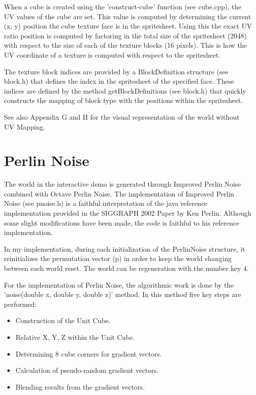 \documentclass{book}
\begin{document}
When a cube is created using the 'construct-cube' function (see cube.cpp), the UV values of the cube are set.  This value is computed by determining the current (x, y) position the cube texture face is in the spritesheet.  Using this the exact UV ratio position is computed by factoring in the total size of the spritesheet (2048) with respect to the size of each of the texture blocks (16 pixels).  This is how the UV coordinate of a texture is computed with respect to the spritesheet.
    
The texture block indices are provided by a BlockDefinition structure (see block.h) that defines the index in the spritesheet of the specified face.  These indices are defined by the method getBlockDefinitions (see block.h) that quickly constructs the mapping of block type with the positions within the spritesheet.
    
See also Appendix G and H for the visual representation of the world without UV Mapping.
    
\section{Perlin Noise}
The world in the interactive demo is generated through Improved Perlin Noise combined with Octave Perlin Noise.  The implementation of Improved Perlin Noise (see pnoise.h) is a faithful interpretation of the java reference implementation provided in the SIGGRAPH 2002 Paper by Ken Perlin.  Although some slight modifications have been made, the code is faithful to his reference implementation.
    
In my implementation, during each initialization of the PerlinNoise structure, it reinitializes the permutation vector (p) in order to keep the world changing between each world reset.  The world can be regeneration with the number key 4.
    
For the implementation of Perlin Noise, the algorithmic work is done by the 'noise(double x, double y, double z)' method.  In this method five key steps are performed:
    
\begin{itemize}
	\item Construction of the Unit Cube.
	\item Relative X, Y, Z within the Unit Cube.
	\item Determining 8 cube corners for gradient vectors.
	\item Calculation of pseudo-random gradient vectors.
	\item Blending results from the gradient vectors.
\end{itemize}
  
\end{document}
